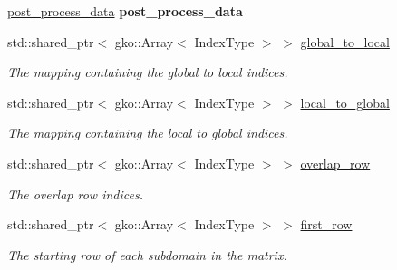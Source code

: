 \begin{DoxyCompactItemize}
\mbox{\label{structschwz_1_1Metadata_abb52c3cb813542a696cb1a9420503bd6}} 
\hyperlink{structschwz_1_1Metadata_1_1post__process__data}{post\+\_\+process\+\_\+data} {\bfseries post\+\_\+process\+\_\+data}
\item 
\mbox{\label{structschwz_1_1Metadata_a0ad24ef496c5e99cb0c5c2e8af3a1fab}} 
std\+::shared\+\_\+ptr$<$ gko\+::\+Array$<$ Index\+Type $>$ $>$ \hyperlink{structschwz_1_1Metadata_a0ad24ef496c5e99cb0c5c2e8af3a1fab}{global\+\_\+to\+\_\+local}
\begin{DoxyCompactList}\small\item\em The mapping containing the global to local indices. \end{DoxyCompactList}\item 
\mbox{\label{structschwz_1_1Metadata_acadbecaaeb439bc25e079a595fb084fa}} 
std\+::shared\+\_\+ptr$<$ gko\+::\+Array$<$ Index\+Type $>$ $>$ \hyperlink{structschwz_1_1Metadata_acadbecaaeb439bc25e079a595fb084fa}{local\+\_\+to\+\_\+global}
\begin{DoxyCompactList}\small\item\em The mapping containing the local to global indices. \end{DoxyCompactList}\item 
\mbox{\label{structschwz_1_1Metadata_a4637081afa35e53f7fab1b58b7ec760f}} 
std\+::shared\+\_\+ptr$<$ gko\+::\+Array$<$ Index\+Type $>$ $>$ \hyperlink{structschwz_1_1Metadata_a4637081afa35e53f7fab1b58b7ec760f}{overlap\+\_\+row}
\begin{DoxyCompactList}\small\item\em The overlap row indices. \end{DoxyCompactList}\item 
\mbox{\label{structschwz_1_1Metadata_a7720eefa9814e5a4db0d8705a1cf756f}} 
std\+::shared\+\_\+ptr$<$ gko\+::\+Array$<$ Index\+Type $>$ $>$ \hyperlink{structschwz_1_1Metadata_a7720eefa9814e5a4db0d8705a1cf756f}{first\+\_\+row}
\begin{DoxyCompactList}\small\item\em The starting row of each subdomain in the matrix. \end{DoxyCompactList}\item 

\end{DoxyCompactItemize}
